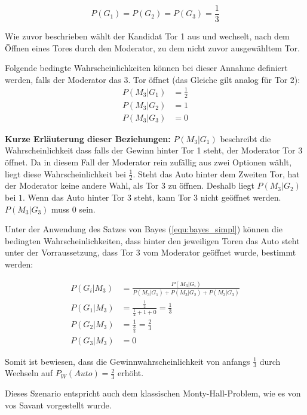 \begin{equation*}
    P(G_1)=P(G_2)=P(G_3)=\frac{1}{3}
\end{equation*}

Wie zuvor beschrieben wählt der Kandidat Tor 1 aus und wechselt, nach dem Öffnen eines Tores durch den Moderator, zu dem nicht zuvor ausgewähltem Tor.

Folgende bedingte Wahrscheinlichkeiten können bei dieser Annahme definiert werden, falls der Moderator das 3. Tor öffnet (das Gleiche gilt analog für Tor 2):
\begin{align*}
    P(M_3 | G_1) & = \frac{1}{2} \\
    P(M_3 | G_2) & = 1           \\
    P(M_3 | G_3) & = 0
\end{align*}

\textbf{Kurze Erläuterung dieser Beziehungen:} $P(M_3 | G_1)$ beschreibt die Wahrscheinlichkeit dass falls der Gewinn hinter Tor 1 steht, der Moderator Tor 3 öffnet. Da in diesem Fall der Moderator rein zufällig aus zwei Optionen wählt, liegt diese Wahrscheinlichkeit bei $\frac{1}{2}$. Steht das Auto hinter dem Zweiten Tor, hat der Moderator keine andere Wahl, als Tor 3 zu öffnen. Deshalb liegt $P(M_3 | G_2)$ bei $1$. Wenn das Auto hinter Tor 3 steht, kann Tor 3 nicht geöffnet werden. $P(M_3 | G_3)$ muss $0$ sein.

Unter der Anwendung des Satzes von Bayes (\autoref{equ:bayes_simpl}) können die bedingten Wahrscheinlichkeiten, dass hinter den jeweiligen Toren das Auto steht unter der Vorraussetzung, dass Tor 3 vom Moderator geöffnet wurde, bestimmt werden:

\begin{align*}
    P(G_i | M_3) & = \frac{P(M_3 | G_i)}{P(M_3 | G_1) +
    P(M_3 | G_2) + P(M_3 | G_3)}                                       \\
    P(G_1 | M_3) & = \frac{\frac{1}{2}}{\frac{1}{2}+1+0} = \frac{1}{3} \\
    P(G_2 | M_3) & = \frac{1}{\frac{3}{2}} = \frac{2}{3}               \\
    P(G_3 | M_3) & = 0
\end{align*}

Somit ist bewiesen, dass die Gewinnwahrscheinlichkeit von anfangs $\frac{1}{3}$ durch Wechseln auf $P_W(Auto) = \frac{2}{3}$ erhöht.

Dieses Szenario entspricht auch dem klassischen Monty-Hall-Problem, wie es von vos Savant vorgestellt wurde.

